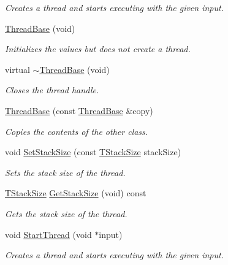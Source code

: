 \begin{DoxyCompactItemize}
\begin{DoxyCompactList}\small\item\em Creates a thread and starts executing with the given input. \end{DoxyCompactList}\item 
\hyperlink{class_thread_base_a95aa3532d57d742e9591b37c4aff1bc7}{Thread\-Base} (void)
\begin{DoxyCompactList}\small\item\em Initializes the values but does not create a thread. \end{DoxyCompactList}\item 
virtual \hyperlink{class_thread_base_a4afe68df229298e2c2920d34ce612e0e}{$\sim$\-Thread\-Base} (void)
\begin{DoxyCompactList}\small\item\em Closes the thread handle. \end{DoxyCompactList}\item 
\hyperlink{class_thread_base_a50bd80044eb3845856abef9535f1903c}{Thread\-Base} (const \hyperlink{class_thread_base}{Thread\-Base} \&copy)
\begin{DoxyCompactList}\small\item\em Copies the contents of the other class. \end{DoxyCompactList}\item 
void \hyperlink{class_thread_base_add14648bdc8059dd8db41166130921dd}{Set\-Stack\-Size} (const \hyperlink{class_thread_base_af45bd74387b409e15989f7eddbaf3718}{T\-Stack\-Size} stack\-Size)
\begin{DoxyCompactList}\small\item\em Sets the stack size of the thread. \end{DoxyCompactList}\item 
\hyperlink{class_thread_base_af45bd74387b409e15989f7eddbaf3718}{T\-Stack\-Size} \hyperlink{class_thread_base_a39e2186d3cf4ddf6b9aa533d59f56546}{Get\-Stack\-Size} (void) const 
\begin{DoxyCompactList}\small\item\em Gets the stack size of the thread. \end{DoxyCompactList}\item 
void \hyperlink{class_thread_base_aaea6437d738ac97e3427bbe466f850f8}{Start\-Thread} (void $\ast$input)
\begin{DoxyCompactList}\small\item\em Creates a thread and starts executing with the given input. \end{DoxyCompactList}\end{DoxyCompactItemize}
